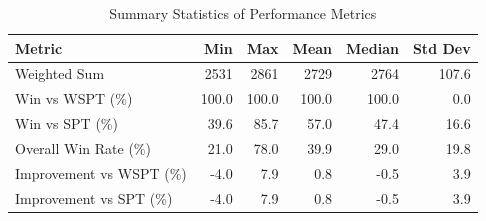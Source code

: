 \begin{table}[htbp]%
\centering%
\begin{tabular}{lrrrrr}%
\toprule%
\textbf{Metric}&\textbf{Min}&\textbf{Max}&\textbf{Mean}&\textbf{Median}&\textbf{Std Dev}\\%
\midrule%
Weighted Sum&2531&2861&2729&2764&107.6\\%
Win vs WSPT (\%)&100.0&100.0&100.0&100.0&0.0\\%
Win vs SPT (\%)&39.6&85.7&57.0&47.4&16.6\\%
Overall Win Rate (\%)&21.0&78.0&39.9&29.0&19.8\\%
Improvement vs WSPT (\%)&-4.0&7.9&0.8&-0.5&3.9\\%
Improvement vs SPT (\%)&-4.0&7.9&0.8&-0.5&3.9\\%
\bottomrule%
\end{tabular}%
\caption{Summary Statistics of Performance Metrics}%
\label{tab:metrics}%
\end{table}